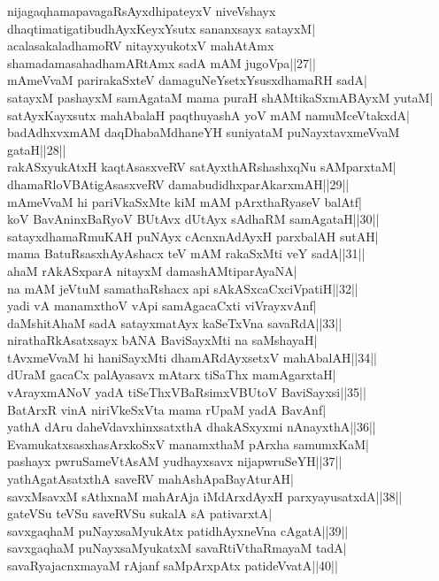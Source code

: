 \documentclass{article}
\begin{document}
nijagaqhamapavagaRsAyxdhipateyxV niveVshayx\\
dhaqtimatigatibudhAyxKeyxYsutx sananxsayx satayxM|\\
acalasakaladhamoRV nitayxyukotxV mahAtAmx\\
shamadamasahadhamARtAmx sadA mAM jugoVpa||27||\\
mAmeVvaM parirakaSxteV damaguNeYsetxYsusxdhamaRH sadA|\\
satayxM pashayxM samAgataM mama puraH shAMtikaSxmABAyxM yutaM|\\
satAyxKayxsutx mahAbalaH paqthuyashA yoV mAM namuMceVtakxdA|\\
badAdhxvxmAM daqDhabaMdhaneYH suniyataM puNayxtavxmeVvaM gataH||28||\\
rakASxyukAtxH kaqtAsasxveRV satAyxthARshashxqNu sAMparxtaM|\\
dhamaRloVBAtigAsasxveRV damabudidhxparAkarxmAH||29||\\
mAmeVvaM hi pariVkaSxMte kiM mAM pArxthaRyaseV balAtf|\\
koV BavAninxBaRyoV BUtAvx dUtAyx sAdhaRM samAgataH||30||\\
satayxdhamaRmuKAH puNAyx cAcnxnAdAyxH parxbalAH sutAH|\\
mama BatuRsasxhAyAshacx teV mAM rakaSxMti veY sadA||31||\\
ahaM rAkASxparA nitayxM damashAMtiparAyaNA|\\
na mAM jeVtuM samathaRshacx api sAkASxcaCxciVpatiH||32||\\
yadi vA manamxthoV vApi samAgacaCxti viVrayxvAnf|\\
daMshitAhaM sadA satayxmatAyx kaSeTxVna savaRdA||33||\\
nirathaRkAsatxsayx bANA BaviSayxMti na saMshayaH|\\
tAvxmeVvaM hi haniSayxMti dhamARdAyxsetxV mahAbalAH||34||\\
dUraM gacaCx palAyasavx mAtarx tiSaThx mamAgarxtaH|\\
vArayxmANoV yadA tiSeThxVBaRsimxVBUtoV BaviSayxsi||35||\\
BatArxR vinA niriVkeSxVta mama rUpaM yadA BavAnf|\\
yathA dAru daheVdavxhinxsatxthA dhakASxyxmi nAnayxthA||36||\\
EvamukatxsasxhasArxkoSxV manamxthaM pArxha samumxKaM|\\
pashayx pwruSameVtAsAM yudhayxsavx nijapwruSeYH||37||\\
yathAgatAsatxthA saveRV mahAshApaBayAturAH|\\
savxMsavxM sAthxnaM mahArAja iMdArxdAyxH parxyayusatxdA||38||\\
gateVSu teVSu saveRVSu sukalA sA pativarxtA|\\
savxgaqhaM puNayxsaMyukAtx patidhAyxneVna cAgatA||39||\\
savxgaqhaM puNayxsaMyukatxM savaRtiVthaRmayaM tadA|\\
savaRyajacnxmayaM rAjanf saMpArxpAtx patideVvatA||40||
\end{document}
